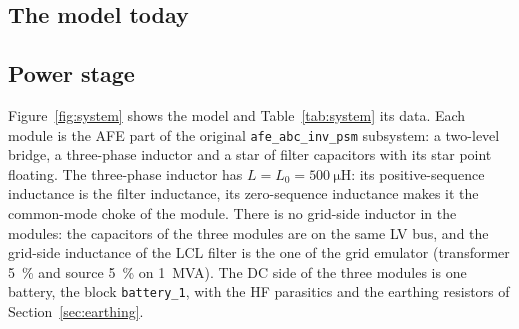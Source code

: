 \documentclass[11pt,a4paper]{scrartcl}
\newcommand{\code}[1]{\texttt{#1}}
\begin{document}
\begin{onehalfspace}
\section{The model today}
\label{sec:model}

\subsection{Power stage}

Figure~\ref{fig:system} shows the model and Table~\ref{tab:system} its data. Each module is the AFE part of the original \code{afe\_abc\_inv\_psm} subsystem: a two-level bridge, a three-phase inductor and a star of filter capacitors with its star point floating. The three-phase inductor has $L = L_0 = \SI{500}{\micro\henry}$: its positive-sequence inductance is the filter inductance, its zero-sequence inductance makes it the common-mode choke of the module. There is no grid-side inductor in the modules: the capacitors of the three modules are on the same LV bus, and the grid-side inductance of the LCL filter is the one of the grid emulator (transformer \SI{5}{\percent} and source \SI{5}{\percent} on \SI{1}{MVA}). The DC side of the three modules is one battery, the block \code{battery\_1}, with the HF parasitics and the earthing resistors of Section~\ref{sec:earthing}.


\end{onehalfspace}
\end{document}
